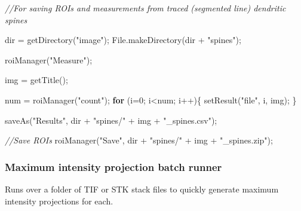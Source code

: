 \documentclass[
  12pt,
  a4paper,
]{book}
\newenvironment{Shaded}{}{}
\newcommand{\CommentTok}[1]{\textcolor[rgb]{0.38,0.63,0.69}{\textit{#1}}}
\newcommand{\ControlFlowTok}[1]{\textcolor[rgb]{0.00,0.44,0.13}{\textbf{#1}}}
\newcommand{\DecValTok}[1]{\textcolor[rgb]{0.25,0.63,0.44}{#1}}
\newcommand{\NormalTok}[1]{#1}
\newcommand{\OperatorTok}[1]{\textcolor[rgb]{0.40,0.40,0.40}{#1}}
\newcommand{\StringTok}[1]{\textcolor[rgb]{0.25,0.44,0.63}{#1}}
\begin{document}
\begin{Shaded}
\begin{Highlighting}[]
\CommentTok{//For saving ROIs and measurements from traced (segmented line) dendritic spines}

\NormalTok{dir }\OperatorTok{=}\NormalTok{ getDirectory}\OperatorTok{(}\StringTok{"image"}\OperatorTok{);}
\NormalTok{File}\OperatorTok{.}\NormalTok{makeDirectory}\OperatorTok{(}\NormalTok{dir }\OperatorTok{+} \StringTok{"spines"}\OperatorTok{);}

\NormalTok{roiManager}\OperatorTok{(}\StringTok{"Measure"}\OperatorTok{);}

\NormalTok{img }\OperatorTok{=}\NormalTok{ getTitle}\OperatorTok{();}

\NormalTok{num }\OperatorTok{=}\NormalTok{ roiManager}\OperatorTok{(}\StringTok{"count"}\OperatorTok{);}
\ControlFlowTok{for} \OperatorTok{(}\NormalTok{i}\OperatorTok{=}\DecValTok{0}\OperatorTok{;}\NormalTok{ i}\OperatorTok{\textless{}}\NormalTok{num}\OperatorTok{;}\NormalTok{ i}\OperatorTok{++)\{}
\NormalTok{    setResult}\OperatorTok{(}\StringTok{"file"}\OperatorTok{,}\NormalTok{ i}\OperatorTok{,}\NormalTok{ img}\OperatorTok{);}
\OperatorTok{\}}

\NormalTok{saveAs}\OperatorTok{(}\StringTok{"Results"}\OperatorTok{,}\NormalTok{ dir }\OperatorTok{+} \StringTok{"spines/"} \OperatorTok{+}\NormalTok{ img }\OperatorTok{+} \StringTok{"\_spines.csv"}\OperatorTok{);}

\CommentTok{//Save ROIs}
\NormalTok{roiManager}\OperatorTok{(}\StringTok{"Save"}\OperatorTok{,}\NormalTok{ dir }\OperatorTok{+} \StringTok{"spines/"} \OperatorTok{+}\NormalTok{ img }\OperatorTok{+} \StringTok{"\_spines.zip"}\OperatorTok{);}
\end{Highlighting}
\end{Shaded}

\hypertarget{maximum-intensity-projection-batch-runner}{%
\subsubsection{Maximum intensity projection batch runner}\label{maximum-intensity-projection-batch-runner}}

Runs over a folder of TIF or STK stack files to quickly generate maximum intensity projections for each.
\end{document}
